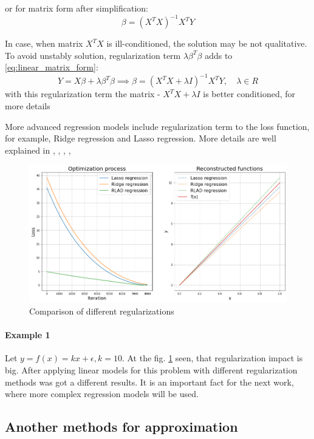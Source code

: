 or for matrix form after simplification:
$$
	\beta = \left ( X^T X \right )^{-1} X^T Y
$$

In case, when matrix $X^T X$ is ill-conditioned, the solution may be not qualitative. To avoid unstably solution, regularization term $\lambda \beta^T \beta$  adds to \eqref{eq:linear_matrix_form}:
\begin{equation}
	Y = X \beta + \lambda \beta^T \beta \implies \beta = \left ( X^T X + \lambda I \right )^{-1} X^T Y, \quad \lambda \in R
\end{equation}
with this regularization term the matrix - $X^T X + \lambda I$ is better conditioned, for more details \cite{kress2012numerical} %


More advanced regression models include regularization term to the loss function, for example, Ridge regression and Lasso regression. More details are well explained in \cite{ridge}, \cite{lasso}, \cite{dantzig_selector}, \cite{rlad}, \cite{slope}

\begin{figure}[h]
	\centering
	\includegraphics[width=0.8 \textwidth]{images/chapter2/reularization_impact.png}
	\caption{Comparison of different regularizations}
	\label{fig:regularizations}
\end{figure}

\paragraph{Example 1}
Let $y = f(x) = k  x + \epsilon, k = 10$. At the fig. \ref{fig:regularizations} seen, that regularization impact is big. After applying linear models for this problem with different regularization methods was got a different results. It is an important fact for the next work, where more complex regression models will be used. 

\subsection{Another methods for approximation}

